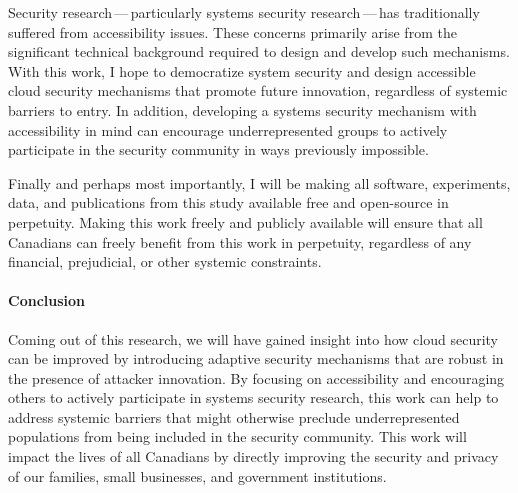 Security research\,---\,particularly systems security research\,---\,has traditionally suffered from accessibility issues. These concerns primarily arise from the significant technical background required to design and develop such mechanisms. With this work, I hope to democratize system security and design accessible cloud security mechanisms that promote future innovation, regardless of systemic barriers to entry. In addition, developing a systems security mechanism with accessibility in mind can encourage underrepresented groups to actively participate in the security community in ways previously impossible.

Finally and perhaps most importantly, I will be making all software, experiments, data, and publications from this study available free and open-source in perpetuity. Making this work freely and publicly available will ensure that all Canadians can freely benefit from this work in perpetuity, regardless of any financial, prejudicial, or other systemic constraints.

\paragraph*{Conclusion}

Coming out of this research, we will have gained insight into how cloud security can be improved by introducing adaptive security mechanisms that are robust in the presence of attacker innovation. By focusing on accessibility and encouraging others to actively participate in systems security research, this work can help to address systemic barriers that might otherwise preclude underrepresented populations from being included in the security community. This work will impact the lives of all Canadians by directly improving the security and privacy of our families, small businesses, and government institutions.
